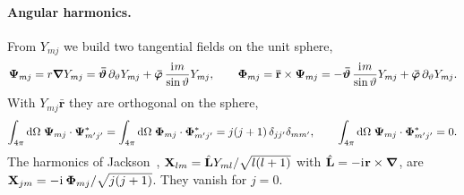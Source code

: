 \documentclass[
    pra,
    aps,
    reprint,
    onecolumn,
    amsmath,amssymb,
    a4paper,
    superscriptaddress,
    10pt,
    nofootinbib
]{revtex4-2}
\newcommand{\iu}{\mathrm{i}\mkern1mu}                 %
\newcommand{\ort}[1]{\boldsymbol{\mathbf{\bar{#1}}}}  %
\newcommand{\jj}{j(j+1)}
\begin{document}
\paragraph{Angular harmonics.}
From $Y_{mj}$ we build two tangential fields on the unit sphere,
\begin{equation}
    \vb{\Psi}_{mj} = r\grad Y_{mj} = \ort{\vartheta}\, \partial_\vartheta Y_{mj} + \ort{\varphi}\, \frac{\iu m}{\sin\vartheta} Y_{mj}, \qquad
    \vb{\Phi}_{mj} = \ort{r} \times \vb{\Psi}_{mj} = -\ort{\vartheta}\, \frac{\iu m}{\sin\vartheta} Y_{mj} + \ort{\varphi}\, \partial_\vartheta Y_{mj} .
    \label{eq:PsiPhi}
\end{equation}
With $Y_{mj}\ort{r}$ they are orthogonal on the sphere,
\begin{equation}
    \int_{4\pi}\dd\Omega\; \vb{\Psi}_{mj}\cdot\vb{\Psi}^*_{m'j'} = \int_{4\pi}\dd\Omega\; \vb{\Phi}_{mj}\cdot\vb{\Phi}^*_{m'j'} = \jj\, \delta_{jj'}\delta_{mm'}, \qquad
    \int_{4\pi}\dd\Omega\; \vb{\Psi}_{mj}\cdot\vb{\Phi}^*_{m'j'} = 0 .
    \label{eq:PsiPhi_orth}
\end{equation}
The harmonics of Jackson~\cite[Sec.~9.7]{Jackson1998}, $\vb{X}_{lm} = \hat{\vb{L}} Y_{ml}/\sqrt{l(l+1)}$ with $\hat{\vb{L}} = -\iu\vb{r}\times\grad$, are $\vb{X}_{jm} = -\iu\, \vb{\Phi}_{mj}/\sqrt{\jj}$.
They vanish for $j = 0$.
\end{document}
